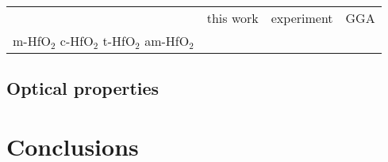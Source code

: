 \documentclass[10pt,a4paper,twocolumn]{article}
\begin{document}
\begin{table}
\begin{center}

\begin{tabular}{c|c|c|c}
			& this work & experiment & GGA \\
m-HfO$_2$
c-HfO$_2$
t-HfO$_2$
am-HfO$_2$

\end{tabular}

\end{center}
\end{table}

\subsection{Optical properties}

\section{Conclusions}



\end{document}
